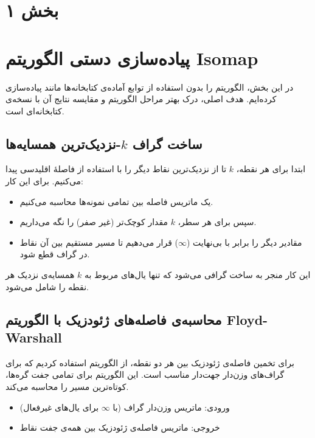 \documentclass[12pt]{report}
\begin{document}
\fontsize{12pt}{14pt}\selectfont


\renewcommand{\thesection}{\arabic{section}}

\section{بخش ۱}


\section{پیاده‌سازی دستی الگوریتم Isomap}

در این بخش، الگوریتم  را بدون استفاده از توابع آماده‌ی کتابخانه‌ها مانند  پیاده‌سازی کرده‌ایم. هدف اصلی، درک بهتر مراحل الگوریتم و مقایسه نتایج آن با نسخه‌ی کتابخانه‌ای است.

\subsection{ساخت گراف $k$-نزدیک‌ترین همسایه‌ها}

ابتدا برای هر نقطه، $k$ تا از نزدیک‌ترین نقاط دیگر را با استفاده از فاصلهٔ اقلیدسی پیدا می‌کنیم. برای این کار:

\begin{itemize}
    \item یک ماتریس فاصله  بین تمامی نمونه‌ها محاسبه می‌کنیم.
    \item سپس برای هر سطر، $k$ مقدار کوچک‌تر (غیر صفر) را نگه می‌داریم.
    \item مقادیر دیگر را برابر با بی‌نهایت (\(\infty\)) قرار می‌دهیم تا مسیر مستقیم بین آن نقاط در گراف قطع شود.
\end{itemize}

این کار منجر به ساخت گرافی می‌شود که تنها یال‌های مربوط به $k$ همسایه‌ی نزدیک هر نقطه را شامل می‌شود.

\subsection{محاسبه‌ی فاصله‌های ژئودزیک با الگوریتم Floyd-Warshall}

برای تخمین فاصله‌ی ژئودزیک بین هر دو نقطه، از الگوریتم  استفاده کردیم که برای گراف‌های وزن‌دار جهت‌دار مناسب است. این الگوریتم برای تمامی جفت گره‌ها، کوتاه‌ترین مسیر را محاسبه می‌کند.

\begin{itemize}
    \item ورودی: ماتریس وزن‌دار گراف (با $\infty$ برای یال‌های غیرفعال)
    \item خروجی: ماتریس فاصله‌ی ژئودزیک بین همه‌ی جفت نقاط
\end{itemize}
\end{document}
